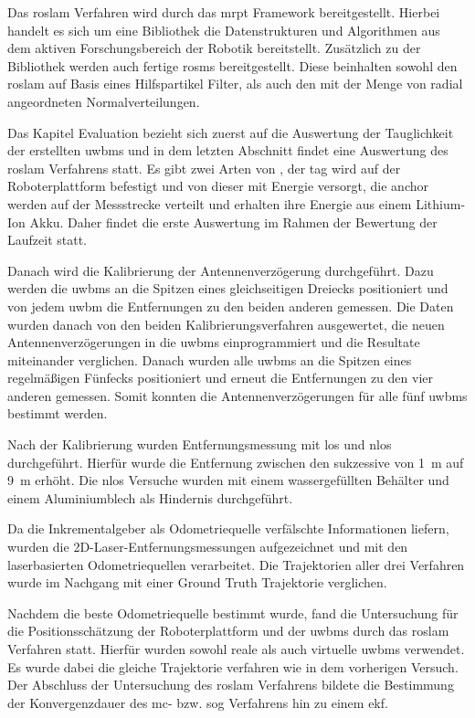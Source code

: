 Das \gls{roslam} Verfahren wird durch das \gls{mrpt} Framework bereitgestellt. Hierbei handelt es sich um eine Bibliothek die Datenstrukturen und Algorithmen aus dem aktiven Forschungsbereich der Robotik bereitstellt. Zusätzlich zu der Bibliothek werden auch fertige \glspl{rosm} bereitgestellt. Diese beinhalten sowohl den \gls{roslam} auf Basis eines Hilfspartikel Filter, als auch den mit der Menge von radial angeordneten Normalverteilungen.

Das Kapitel Evaluation bezieht sich zuerst auf die Auswertung der Tauglichkeit der erstellten \glspl{uwbm} und in dem letzten Abschnitt findet eine Auswertung des \gls{roslam} Verfahrens statt. Es gibt zwei Arten von , der \gls{tag} wird auf der Roboterplattform befestigt und von dieser mit Energie versorgt, die \gls{anchor} werden auf der Messstrecke verteilt und erhalten ihre Energie aus einem Lithium-Ion Akku. Daher findet die erste Auswertung im Rahmen der Bewertung der Laufzeit statt.

Danach wird die Kalibrierung der Antennenverzögerung durchgeführt. Dazu werden die \glspl{uwbm} an die Spitzen eines gleichseitigen Dreiecks positioniert und von jedem \gls{uwbm} die Entfernungen zu den beiden anderen  gemessen. Die Daten wurden danach von den beiden Kalibrierungsverfahren ausgewertet, die neuen Antennenverzögerungen in die \glspl{uwbm} einprogrammiert und die Resultate miteinander verglichen. Danach wurden alle \glspl{uwbm} an die  Spitzen eines regelmäßigen Fünfecks positioniert und erneut die Entfernungen zu den vier anderen  gemessen. Somit konnten die Antennenverzögerungen für alle fünf \glspl{uwbm} bestimmt werden.

Nach der Kalibrierung wurden Entfernungsmessung mit \gls{los} und \gls{nlos} durchgeführt. Hierfür wurde die Entfernung zwischen den  sukzessive von \SI{1}{\meter} auf \SI{9}{\meter} erhöht. Die \gls{nlos} Versuche wurden mit einem wassergefüllten Behälter und einem Aluminiumblech als Hindernis durchgeführt.

Da die Inkrementalgeber als Odometriequelle verfälschte Informationen liefern, wurden die 2D-Laser-Entfernungsmessungen aufgezeichnet und mit den laserbasierten Odometriequellen verarbeitet. Die Trajektorien aller drei Verfahren wurde im Nachgang mit einer Ground Truth Trajektorie verglichen.

Nachdem die beste Odometriequelle bestimmt wurde, fand die Untersuchung für die Positionsschätzung der Roboterplattform und der \glspl{uwbm} durch das \gls{roslam} Verfahren statt. Hierfür wurden sowohl reale als auch virtuelle \glspl{uwbm} verwendet. Es wurde dabei die gleiche Trajektorie verfahren wie in dem vorherigen Versuch. Der Abschluss der Untersuchung des \gls{roslam} Verfahrens bildete die Bestimmung der Konvergenzdauer des \gls{mc}- bzw. \gls{sog} Verfahrens hin zu einem \gls{ekf}.



